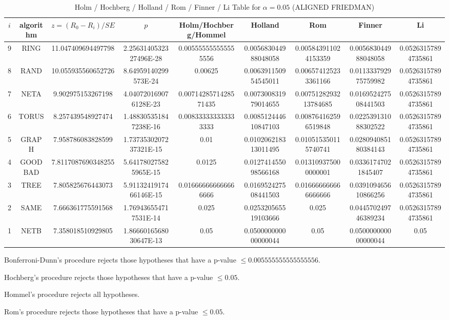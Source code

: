 \documentclass[a4paper,10pt]{article}
\begin{document}
\begin{landscape}
\newpage

\begin{table}[!htp]
\centering\scriptsize
\caption{Holm / Hochberg / Holland / Rom / Finner / Li Table for $\alpha=0.05$ (ALIGNED FRIEDMAN)}
\begin{tabular}{ccccccccc}
$i$&algorithm&$z=(R_0 - R_i)/SE$&$p$&Holm/Hochberg/Hommel&Holland&Rom&Finner&Li\\
\hline
9& RING&11.047409694497798&2.2563140532327496E-28&0.005555555555555556&0.005683044988048058&0.005843911024153359&0.005683044988048058&0.05263157894735861\\
8& RAND&10.055935560652726&8.64959140299573E-24&0.00625&0.006391150954545011&0.006574125233361166&0.011333792975759982&0.05263157894735861\\
7& NETA&9.902975153267198&4.040720169076128E-23&0.0071428571428571435&0.007300831979014655&0.0075128293213784685&0.016952427508441503&0.05263157894735861\\
6& TORUS&8.257439548927474&1.488305351847238E-16&0.008333333333333333&0.008512444610847103&0.008764162596519848&0.022539131088302522&0.05263157894735861\\
5& GRAPH&7.958786083828599&1.7373530207237321E-15&0.01&0.010206218313011495&0.010515350115740741&0.028094085180384143&0.05263157894735861\\
4& GOODBAD&7.8117087690348255&5.641780275825965E-15&0.0125&0.012741455098566168&0.013109375000000001&0.03361747021845407&0.05263157894735861\\
3& TREE&7.805825676443073&5.9113241917466146E-15&0.016666666666666666&0.016952427508441503&0.016666666666666666&0.039109465610866256&0.05263157894735861\\
2& SAME&7.666361775591568&1.769436554717531E-14&0.025&0.025320565519103666&0.025&0.044570249746389234&0.05263157894735861\\
1& NETB&7.358018510929805&1.8666016568030647E-13&0.05&0.050000000000000044&0.05&0.050000000000000044&0.05\\
\hline
\end{tabular}
\end{table}
Bonferroni-Dunn's procedure rejects those hypotheses that have a p-value $\le0.005555555555555556$.


Hochberg's procedure rejects those hypotheses that have a p-value $\le0.05$.


Hommel's procedure rejects all hypotheses.


Rom's procedure rejects those hypotheses that have a p-value $\le0.05$.



\end{landscape}
\end{document}
